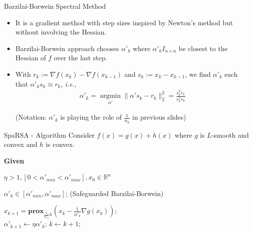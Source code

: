 \documentclass{beamer}
\DeclareMathOperator*{\argmin}{argmin}
\begin{document}
\begin{frame}{Barzilai-Borwein Spectral Method}
\begin{itemize}
    \item It is a gradient method with step sizes inspired by Newton's method but without involving the Hessian.
    \pause
    \item Barzilai-Borwein approach chooses $\alpha'_k$ where $\alpha'_kI_{n\times n}$ be closest to the Hessian of $f$ over the last step.
    \pause
    \item With $r_k := \nabla f (x_k) - \nabla f (x_{k-1})$ and $ s_k := x_k - x_{k-1}$, we find $\alpha'_k$ such that $\alpha'_k s_k \approx r_k$, \textit{i.e.,}
    \begin{align*}
        \alpha'_k = \underset{\alpha'}{\argmin} \| \alpha' s_k - r_k \|_2^2=\frac{s_k^Tr_k}{s_k^Ts_k}
    \end{align*}
    \vspace{20pt}
    \begin{center}
        (Notation: $\alpha'_k$ is playing the role of $\frac{1}{\alpha_k}$ in previous slides)
    \end{center}
\end{itemize}

\end{frame}

\begin{frame}{SpaRSA - Algorithm}
Consider $f(x)=g(x)+h(x)$ where $g$ is $L$-smooth and convex and $h$ is convex.\\
\vspace{20pt}
\begin{algorithm}[H]
\textbf{Given}

    \textbf{$\eta >1 ,[0 <\alpha'_{min} < \alpha'_{max}], x_0 \in \mathbb{R}^n$}

    {
        $\alpha'_k \in [\alpha'_{min}, \alpha'_{max}]$; \hspace{10pt}(Safeguarded Barzilai-Borwein)

            {$x_{k+1} = \mathbf{prox}_{\frac{1}{\alpha'_k}h}(x_k-\frac{1}{\alpha'_k}\nabla g(x_k))$;\\
            $\alpha'_{k+1} \xleftarrow{} \eta \alpha'_k$;
            }
        $k \xleftarrow{} k + 1$;
    }
\end{algorithm}
    
\end{frame}
\end{document}
